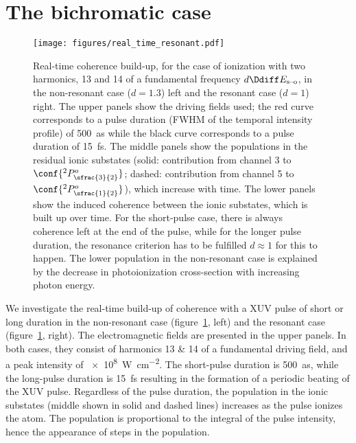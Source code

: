 \section{The bichromatic case}
\label{sec:bichromatic}
\begin{figure}[tb]
  \centering
  \texttt{[image: figures/real\_time\_resonant.pdf]}
  \caption{\label{fig:real-time-coherence} Real-time coherence
    build-up, for the case of ionization with two harmonics, 13 and 14
    of a fundamental frequency \(d\Ddiff E_{\textrm{s--o}}\), in the
    non-resonant case (\(d=1.3\)) left and the resonant case (\(d=1\))
    right. The upper panels show the driving fields used; the red
    curve corresponds to a pulse duration (FWHM of the temporal
    intensity profile) of \SI{500}{\atto\second} while the black curve
    corresponds to a pulse duration of \SI{15}{\femto\second}. The
    middle panels show the populations in the residual ionic substates
    (solid: contribution from channel 3 to
    \(\conf{^2P^o_{\sfrac{3}{2}}}\); dashed: contribution from channel
    5 to \(\conf{^2P^o_{\sfrac{1}{2}}}\)), which increase with
    time. The lower panels show the induced coherence between the
    ionic substates, which is built up over time. For the short-pulse
    case, there is always coherence left at the end of the pulse,
    while for the longer pulse duration, the resonance criterion has
    to be fulfilled \(d\approx1\) for this to happen. The lower population
    in the non-resonant case is explained by the decrease in
    photoionization cross-section with increasing photon energy.}
\end{figure}
We investigate the real-time build-up of coherence with a XUV pulse of
short or long duration in the non-resonant case
(figure~\ref{fig:real-time-coherence}, left) and the resonant case
(figure~\ref{fig:real-time-coherence}, right). The electromagnetic
fields are presented in the upper panels. In both cases, they consist
of harmonics 13 \& 14 of a fundamental driving field, and a peak
intensity of \SI{e8}{\watt\per\centi\meter\squared}. The short-pulse
duration is \SI{500}{\atto\second}, while the long-pulse duration is
\SI{15}{\femto\second} resulting in the formation of a periodic
beating of the XUV pulse. Regardless of the pulse duration, the
population in the ionic substates (middle shown in solid and dashed
lines) increases as the pulse ionizes the atom. The population is
proportional to the integral of the pulse intensity, hence the
appearance of steps in the population.

